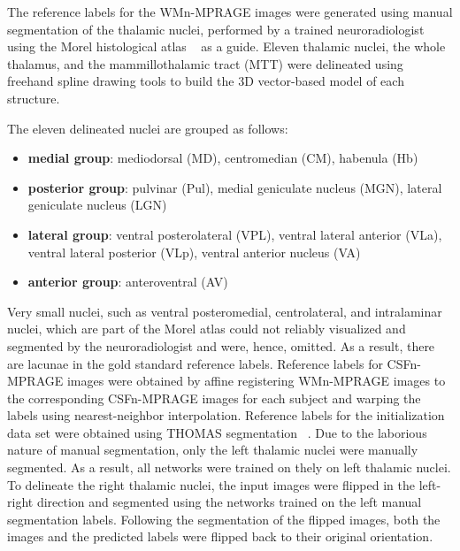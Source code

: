 \documentclass[3p,,final,12pt]{elsarticle}
\begin{document}
The reference labels for the WMn-MPRAGE images were generated using manual segmentation of the thalamic nuclei, performed by a trained neuroradiologist using the Morel histological atlas \unskip~\cite{1643371:26789963} as a guide. Eleven thalamic nuclei, the whole thalamus, and the mammillothalamic tract (MTT) were delineated using freehand spline drawing tools to build the 3D vector-based model of each structure. 

The eleven delineated nuclei are grouped as follows:



\begin{itemize}
  \item \relax \textbf{medial group}: mediodorsal (MD), centromedian (CM), habenula (Hb)
  \item \relax \textbf{posterior group}: pulvinar (Pul), medial geniculate nucleus (MGN), lateral geniculate nucleus (LGN)
  \item \relax \textbf{lateral group}: ventral posterolateral (VPL), ventral lateral anterior (VLa), ventral lateral posterior (VLp), ventral anterior nucleus (VA)
  \item \relax \textbf{anterior group}:  anteroventral (AV)
\end{itemize}
  Very small nuclei, such as ventral posteromedial, centrolateral, and intralaminar nuclei, which are part of the Morel atlas could not reliably visualized and segmented by the neuroradiologist and were, hence, omitted. As a result, there are lacunae in the gold standard reference labels. Reference labels for CSFn-MPRAGE images were obtained by affine registering WMn-MPRAGE images to the corresponding CSFn-MPRAGE images for each subject and warping the labels using nearest-neighbor interpolation. Reference labels for the initialization data set were obtained using THOMAS segmentation \unskip~\cite{1643371:26789960}. Due to the laborious nature of manual segmentation, only the left thalamic nuclei were manually segmented. As a result, all networks were trained on thely on left thalamic nuclei. To delineate the right thalamic nuclei, the input images were flipped in the left-right direction and segmented using the networks trained on the left manual segmentation labels. Following the segmentation of the flipped images, both the images and the predicted labels were flipped back to their original orientation.
\end{document}

